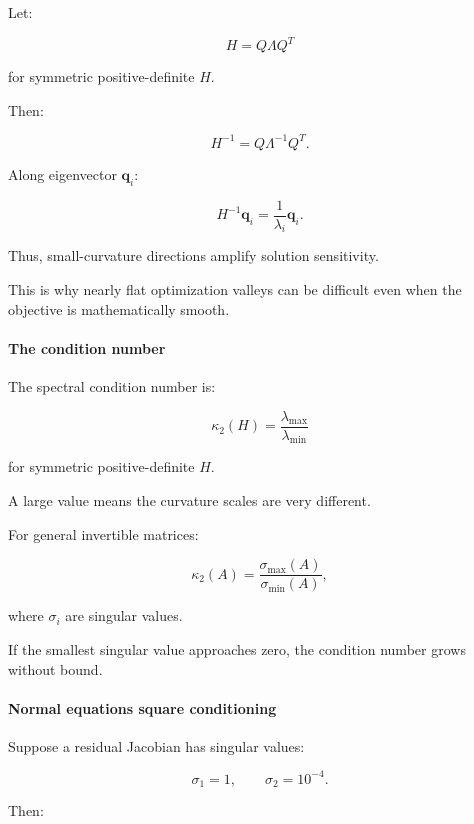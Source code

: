 \hypertarget{02-foundations-ii-ch027-singular-value-interpretation}{}

Let:

\[
H=Q\Lambda Q^T
\]

for symmetric positive-definite \(H\).

Then:

\[
H^{-1}=Q\Lambda^{-1}Q^T.
\]

Along eigenvector \(\mathbf q_i\):

\[
H^{-1}\mathbf q_i= \frac1{\lambda_i}\mathbf q_i.
\]

Thus, small-curvature directions amplify solution sensitivity.

This is why nearly flat optimization valleys can be difficult even when the objective is mathematically smooth.

\paragraph{The condition number}\label{02-foundations-ii-ch027-the-condition-number}

\hypertarget{02-foundations-ii-ch027-the-condition-number}{}

The spectral condition number is:

\[
\boxed{ \kappa_2(H)= \frac{\lambda_{\max}}{\lambda_{\min}} }
\]

for symmetric positive-definite \(H\).

A large value means the curvature scales are very different.

For general invertible matrices:

\[
\kappa_2(A)= \frac{\sigma_{\max}(A)}{\sigma_{\min}(A)},
\]

where \(\sigma_i\) are singular values.

If the smallest singular value approaches zero, the condition number grows without bound.

\paragraph{Normal equations square conditioning}\label{02-foundations-ii-ch027-normal-equations-square-conditioning}

\hypertarget{02-foundations-ii-ch027-normal-equations-square-conditioning}{}

Suppose a residual Jacobian has singular values:

\[
\sigma_1=1,\qquad\sigma_2=10^{-4}.
\]

Then:

